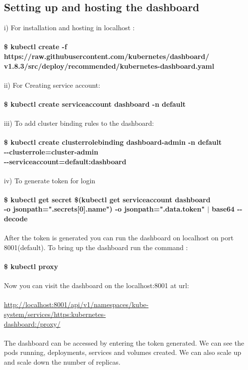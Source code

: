 \documentclass[12pt]{report}
\begin{document}
\subsection{Setting up and hosting the dashboard \cite{Dashboard}}
i) For installation and hosting in localhost : \\\\
\textbf{\$ kubectl create -f https://raw.githubusercontent.com/kubernetes/dashboard/\\v1.8.3/src/deploy/recommended/kubernetes-dashboard.yaml}\\\\
ii) For Creating service account:\\\\
\textbf{\$ kubectl create serviceaccount dashboard -n default}\\\\
iii) To add cluster binding rules to the dashboard:\\\\
\textbf{\$ kubectl create clusterrolebinding dashboard-admin -n default 
	\\-{}-clusterrole=cluster-admin 
	\\-{}-serviceaccount=default:dashboard}\\\\
iv) To generate token for login\\\\
\textbf{\$ kubectl get secret \$(kubectl get serviceaccount dashboard\\ -o jsonpath="{.secrets[0].name}") -o jsonpath="{.data.token}" $|$ base64 -{}-decode}\\\\
After the token is generated you can run the dashboard on localhost on port 8001(default). To bring up the dashboard run the command :\\\\
\textbf{\$ kubectl proxy}\\\\
Now you can visit the dashboard on the localhost:8001 at url:\\\\
\href{http://localhost:8001/api/v1/namespaces/kube-system/services/https:kubernetes-dashboard:/proxy/}{http://localhost:8001/api/v1/namespaces/kube-system/services/https:kubernetes-\\dashboard:/proxy/}\\\\
The dashboard can be accessed by entering the token generated. We can see the pods running, deployments, services and volumes created. We can also scale up and scale down the number of replicas.
\end{document}
